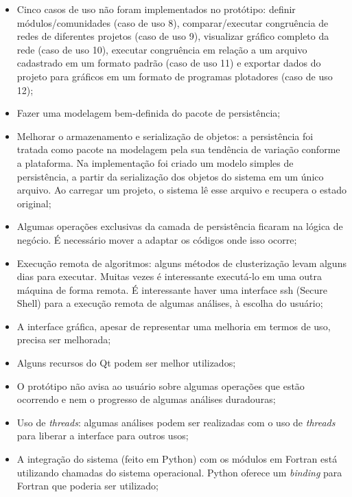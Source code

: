 \begin{itemize}
  \item{Cinco casos de uso não foram implementados no protótipo: definir módulos/comunidades (caso de uso 8), comparar/executar congruência de redes de
diferentes projetos (caso de uso 9), visualizar gráfico completo da rede (caso de uso 10), executar congruência em relação a um arquivo cadastrado em um
formato padrão (caso de uso 11) e exportar dados do projeto para gráficos em um formato de programas plotadores (caso de uso 12);}
  \item{Fazer uma modelagem bem-definida do pacote de persistência;}
  \item{Melhorar o armazenamento e serialização de objetos: a persistência foi tratada como pacote na modelagem pela sua tendência de variação conforme
a plataforma. Na implementação foi criado um modelo simples de persistência, a partir da serialização dos objetos do sistema em um único arquivo. Ao
carregar um projeto, o sistema lê esse arquivo e recupera o estado original;}
  \item{Algumas operações exclusivas da camada de persistência ficaram na lógica de negócio. É necessário mover a adaptar os códigos onde isso ocorre;}
  \item{Execução remota de algoritmos: alguns métodos de clusterização levam alguns dias para executar. Muitas vezes é interessante executá-lo em uma outra
máquina de forma remota. É interessante haver uma interface ssh (Secure Shell) para a execução remota de algumas análises, à escolha do usuário;}
  \item{A interface gráfica, apesar de representar uma melhoria em termos de uso, precisa ser melhorada;}
  \item{Alguns recursos do Qt podem ser melhor utilizados;}
  \item{O protótipo não avisa ao usuário sobre algumas operações que estão ocorrendo e nem o progresso de algumas análises duradouras;}
  \item{Uso de \textit{threads}: algumas análises podem ser realizadas com o uso de \textit{threads} para liberar a interface para outros usos;}
  \item{A integração do sistema (feito em Python) com os módulos em Fortran está utilizando chamadas do sistema operacional. Python oferece um
\textit{binding} para Fortran que poderia ser utilizado;}
\end{itemize}

